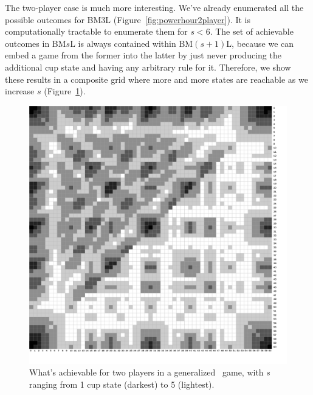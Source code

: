 \documentclass[twocolumn]{article}
\begin{document}
The two-player case is much more interesting. We've already enumerated
all the possible outcomes for BM3L
(Figure~\ref{fig:powerhour2player}). It is computationally tractable
to enumerate them for $s < 6$. The set of achievable outcomes in
BM$s$L is always contained within BM$(s+1)$L, because we can embed a
game from the former into the latter by just never producing the
additional cup state and having any arbitrary rule for it. Therefore,
we show these results in a composite grid where more and more states
are reachable as we increase $s$ (Figure~\ref{fig:composite2player}).

\begin{figure}
\begin{center}
\includegraphics[width=0.90 \linewidth]{composite2playermock.png}
\end{center}\vspace{-0.1in}
\caption{What's achievable for two players in a generalized \bmsl\ game,
  with $s$ ranging from 1 cup state (darkest) to 5 (lightest).
}
\label{fig:composite2player}
\end{figure}
\end{document}
